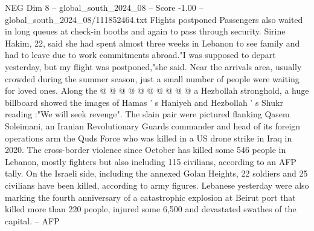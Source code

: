 \begin{textsample}{NEG Dim 8 – global\_south\_2024\_08 – Score -1.00 – global\_south\_2024\_08/111852464.txt}
Flights postponed Passengers also waited in long queues at check-in booths and again to pass through security.
Sirine Hakim, 22, said she had spent almost three weeks in Lebanon to see family and had to leave due to work commitments abroad."I was supposed to depart yesterday, but my flight was postponed,"she said.
Near the arrivals area, usually crowded during the summer season, just a small number of people were waiting for loved ones.
Along the @ @ @ @ @ @ @ @ @ @ a Hezbollah stronghold, a huge billboard showed the images of Hamas ' s Haniyeh and Hezbollah ' s Shukr reading :"We will seek revenge".
The slain pair were pictured flanking Qasem Soleimani, an Iranian Revolutionary Guards commander and head of its foreign operations arm the Quds Force who was killed in a US drone strike in Iraq in 2020.
The cross-border violence since October has killed some 546 people in Lebanon, mostly fighters but also including 115 civilians, according to an AFP tally.
On the Israeli side, including the annexed Golan Heights, 22 soldiers and 25 civilians have been killed, according to army figures.
Lebanese yesterday were also marking the fourth anniversary of a catastrophic explosion at Beirut port that killed more than 220 people, injured some 6,500 and devastated swathes of the capital. -- AFP

\end{textsample}
